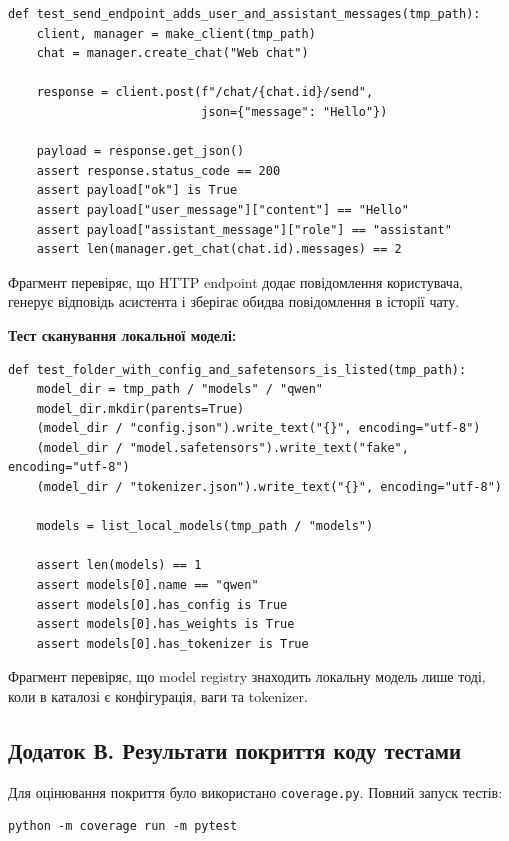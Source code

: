 \begin{lstlisting}[style=plantumlstyle]
def test_send_endpoint_adds_user_and_assistant_messages(tmp_path):
    client, manager = make_client(tmp_path)
    chat = manager.create_chat("Web chat")

    response = client.post(f"/chat/{chat.id}/send",
                           json={"message": "Hello"})

    payload = response.get_json()
    assert response.status_code == 200
    assert payload["ok"] is True
    assert payload["user_message"]["content"] == "Hello"
    assert payload["assistant_message"]["role"] == "assistant"
    assert len(manager.get_chat(chat.id).messages) == 2
\end{lstlisting}

Фрагмент перевіряє, що HTTP endpoint додає повідомлення користувача, генерує відповідь асистента і зберігає обидва повідомлення в історії чату.

\textbf{Тест сканування локальної моделі:}

\begin{lstlisting}[style=plantumlstyle]
def test_folder_with_config_and_safetensors_is_listed(tmp_path):
    model_dir = tmp_path / "models" / "qwen"
    model_dir.mkdir(parents=True)
    (model_dir / "config.json").write_text("{}", encoding="utf-8")
    (model_dir / "model.safetensors").write_text("fake", encoding="utf-8")
    (model_dir / "tokenizer.json").write_text("{}", encoding="utf-8")

    models = list_local_models(tmp_path / "models")

    assert len(models) == 1
    assert models[0].name == "qwen"
    assert models[0].has_config is True
    assert models[0].has_weights is True
    assert models[0].has_tokenizer is True
\end{lstlisting}

Фрагмент перевіряє, що model registry знаходить локальну модель лише тоді, коли в каталозі є конфігурація, ваги та tokenizer.

\subsection*{Додаток В. Результати покриття коду тестами}

Для оцінювання покриття було використано \texttt{coverage.py}. Повний запуск тестів:

\begin{lstlisting}[style=plantumlstyle]
python -m coverage run -m pytest
\end{lstlisting}


